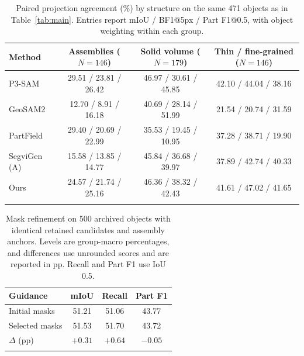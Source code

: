 \documentclass[pdflatex,sn-mathphys-ay]{sn-jnl}
\begin{document}
\begin{table}[t]
\caption{Paired projection agreement (\%) by structure on the same 471 objects as in Table~\ref{tab:main}. Entries report mIoU / BF1@5px / Part F1@0.5, with object weighting within each group.}
\label{tab:projection_group}
\setlength{\tabcolsep}{3pt}
\begin{tabular*}{\textwidth}{@{\extracolsep{\fill}}lccc@{}}
\toprule
Method & \shortstack{Assemblies\\($N=146$)} & \shortstack{Solid volume\\($N=179$)} & \shortstack{Thin / fine-grained\\($N=146$)}\\
\midrule
P3-SAM \citep{ma2025p3sam} & 29.51 / 23.81 / 26.42 & 46.97 / 30.61 / 45.85 & 42.10 / 44.04 / 38.16\\
GeoSAM2 \citep{deng2025geosam2} & 12.70 / 8.91 / 16.18 & 40.69 / 28.14 / 51.99 & 21.54 / 20.74 / 31.59\\
PartField \citep{liu2025partfield} & 29.40 / 20.69 / 22.99 & 35.53 / 19.45 / 10.95 & 37.28 / 38.71 / 19.90\\
SegviGen (A) \citep{li2026segvigen} & 15.58 / 13.85 / 14.77 & 45.84 / 36.68 / 39.97 & 37.89 / 42.74 / 40.33\\
Ours & 24.57 / 21.74 / 25.16 & 46.36 / 38.32 / 42.43 & 41.61 / 47.02 / 41.65\\
\botrule
\end{tabular*}
\end{table}

\begin{table}[t]
\caption{Mask refinement on 500 archived objects with identical retained candidates and assembly anchors. Levels are group-macro percentages, and differences use unrounded scores and are reported in pp. Recall and Part F1 use IoU 0.5.}
\label{tab:audit}
\setlength{\tabcolsep}{8pt}
\begin{tabular}{@{}lccc@{}}
\toprule
Guidance & mIoU & Recall & Part F1\\
\midrule
Initial masks & 51.21 & 51.06 & 43.77\\
Selected masks & 51.53 & 51.70 & 43.72\\
\midrule
$\Delta$ (pp) & $+0.31$ & $+0.64$ & $-0.05$\\
\botrule
\end{tabular}
\end{table}
\end{document}
